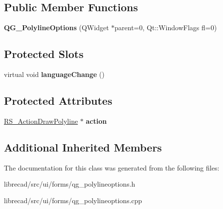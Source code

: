 \subsection*{Public Member Functions}
\begin{DoxyCompactItemize}
\item 
\hypertarget{classQG__PolylineOptions_a8b884f1dea21a0a041b024c197f8c38e}{{\bfseries Q\-G\-\_\-\-Polyline\-Options} (Q\-Widget $\ast$parent=0, Qt\-::\-Window\-Flags fl=0)}\label{classQG__PolylineOptions_a8b884f1dea21a0a041b024c197f8c38e}

\end{DoxyCompactItemize}
\subsection*{Protected Slots}
\begin{DoxyCompactItemize}
\item 
\hypertarget{classQG__PolylineOptions_a474dfbc180be2fac6af359421c6d3484}{virtual void {\bfseries language\-Change} ()}\label{classQG__PolylineOptions_a474dfbc180be2fac6af359421c6d3484}

\end{DoxyCompactItemize}
\subsection*{Protected Attributes}
\begin{DoxyCompactItemize}
\item 
\hypertarget{classQG__PolylineOptions_a0f367c42abe5c90ae44c2441a0143320}{\hyperlink{classRS__ActionDrawPolyline}{R\-S\-\_\-\-Action\-Draw\-Polyline} $\ast$ {\bfseries action}}\label{classQG__PolylineOptions_a0f367c42abe5c90ae44c2441a0143320}

\end{DoxyCompactItemize}
\subsection*{Additional Inherited Members}


The documentation for this class was generated from the following files\-:\begin{DoxyCompactItemize}
\item 
librecad/src/ui/forms/qg\-\_\-polylineoptions.\-h\item 
librecad/src/ui/forms/qg\-\_\-polylineoptions.\-cpp\end{DoxyCompactItemize}
